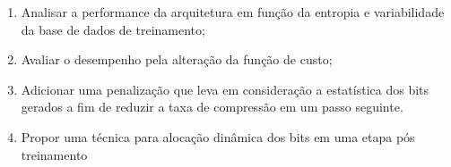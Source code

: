 \begin{enumerate}
	\item Analisar a performance da arquitetura em função da entropia e variabilidade da base de dados de treinamento;
	\item Avaliar o desempenho pela alteração da função de custo;
	\item Adicionar uma penalização que leva em consideração a estatística dos bits gerados a fim de reduzir a taxa de compressão em um passo seguinte.
	\item Propor uma técnica para alocação dinâmica dos bits em uma etapa pós treinamento
\end{enumerate}

 
 

